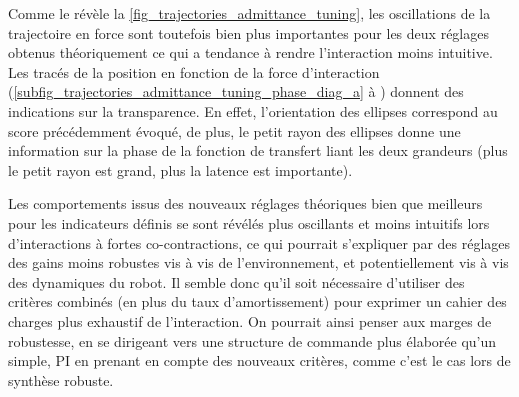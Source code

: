 Comme le révèle la \cref{fig_trajectories_admittance_tuning}, les oscillations de la trajectoire en force sont toutefois bien plus importantes pour les deux réglages obtenus théoriquement ce qui a tendance à rendre l'interaction moins intuitive. Les tracés de la position en fonction de la force d'interaction (\cref{subfig_trajectories_admittance_tuning_phase_diag_a} à ) donnent des indications sur la transparence. En effet, l'orientation des ellipses correspond au score précédemment évoqué, de plus, le petit rayon des ellipses donne une information sur la phase de la fonction de transfert liant les deux grandeurs (plus le petit rayon est grand, plus la latence est importante). 


Les comportements issus des nouveaux réglages théoriques bien que meilleurs pour les indicateurs définis se sont révélés plus oscillants et moins intuitifs lors d'interactions à fortes co-contractions, ce qui pourrait s'expliquer par des réglages des gains moins robustes vis à vis de l'environnement, et potentiellement vis à vis des dynamiques du robot. Il semble donc qu'il soit nécessaire d'utiliser des critères combinés (en plus du taux d'amortissement) pour exprimer un cahier des charges plus exhaustif de l'interaction. On pourrait ainsi penser aux marges de robustesse, en se dirigeant vers une structure de commande plus élaborée qu'un simple, PI en prenant en compte des nouveaux critères, comme c'est le cas lors de synthèse robuste.


\tikzexternaldisable




